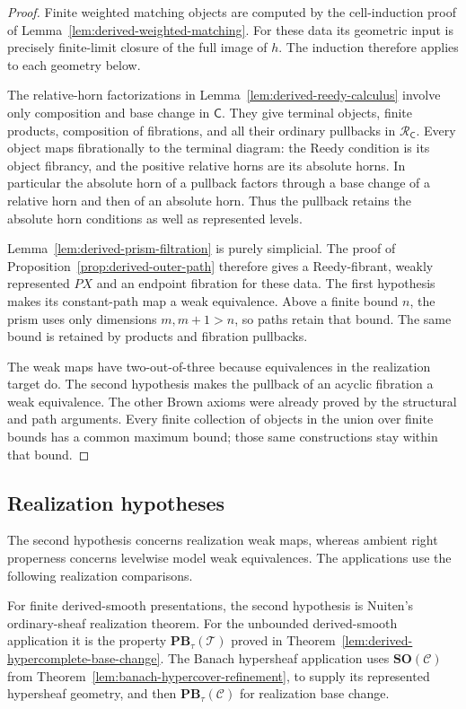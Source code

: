 \documentclass[12pt]{amsart}
\theoremstyle{definition}
\theoremstyle{remark}
\numberwithin{equation}{section}
\begin{document}
\begin{proof}
Finite weighted matching objects are computed by the
cell-induction proof of
Lemma~\ref{lem:derived-weighted-matching}.
For these data its geometric input is precisely
finite-limit closure of the full image of $h$.
The induction therefore applies to each geometry below.

The relative-horn factorizations in
Lemma~\ref{lem:derived-reedy-calculus} involve only
composition and base change in $\mathsf C$.
They give terminal objects, finite products,
composition of fibrations, and all their ordinary
pullbacks in $\mathscr R_{\mathsf C}$.
Every object maps fibrationally to the terminal diagram:
the Reedy condition is its object fibrancy, and the
positive relative horns are its absolute horns.
In particular the absolute horn of a pullback
factors through a base change of a relative horn
and then of an absolute horn. Thus the pullback retains
the absolute horn conditions as well as represented levels.

Lemma~\ref{lem:derived-prism-filtration} is purely
simplicial. The proof of
Proposition~\ref{prop:derived-outer-path} therefore
gives a Reedy-fibrant, weakly represented $PX$
and an endpoint fibration for these data.
The first hypothesis makes its constant-path map
a weak equivalence. Above a finite bound $n$,
the prism uses only dimensions $m,m+1>n$,
so paths retain that bound. The same bound is
retained by products and fibration pullbacks.

The weak maps have two-out-of-three because
equivalences in the realization target do.
The second hypothesis makes the pullback of
an acyclic fibration a weak equivalence.
The other Brown axioms were already proved by
the structural and path arguments.
Every finite collection of objects in the union over finite bounds
has a common maximum bound; those same constructions stay within
that bound.
\end{proof}

\subsection{Realization hypotheses}

The second hypothesis concerns realization weak maps,
whereas ambient right properness concerns levelwise
model weak equivalences. The applications use the
following realization comparisons.

For finite derived-smooth presentations, the second hypothesis
is Nuiten's ordinary-sheaf realization theorem.
For the unbounded derived-smooth application it is the
property $\mathbf{PB}_\tau(\mathcal T)$ proved in
Theorem~\ref{lem:derived-hypercomplete-base-change}.
The Banach hypersheaf application uses
$\mathbf{SO}(\mathcal C)$ from
Theorem~\ref{lem:banach-hypercover-refinement}, to supply
its represented hypersheaf geometry, and then
$\mathbf{PB}_\tau(\mathcal C)$ for realization base change.
\end{document}
